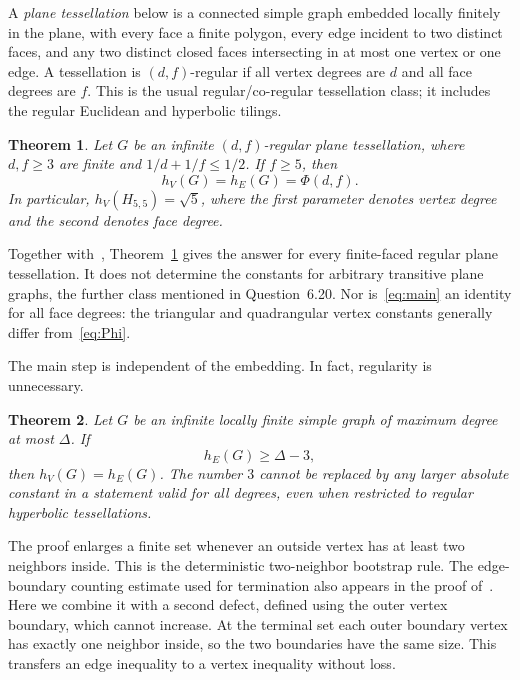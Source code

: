 \documentclass[11pt]{amsart}
\numberwithin{equation}{section}
\newtheorem{theorem}{Theorem}[section]
\theoremstyle{definition}
\theoremstyle{remark}
\newcommand{\hE}{h_E}
\newcommand{\hV}{h_V}
\begin{document}
A \emph{plane tessellation} below is a connected simple graph embedded locally finitely in the plane, with every face a finite polygon, every edge incident to two distinct faces, and any two distinct closed faces intersecting in at most one vertex or one edge. A tessellation is $(d,f)$-regular if all vertex degrees are $d$ and all face degrees are $f$. This is the usual regular/co-regular tessellation class; it includes the regular Euclidean and hyperbolic tilings.

\begin{theorem}\label{thm:tiling}
Let $G$ be an infinite $(d,f)$-regular plane tessellation, where $d,f\ge3$ are finite and $1/d+1/f\le1/2$. If $f\ge5$, then
\begin{equation}\label{eq:main}
\hV(G)=\hE(G)=\Phi(d,f).
\end{equation}
In particular, $\hV(H_{5,5})=\sqrt5$, where the first parameter denotes vertex degree and the second denotes face degree.
\end{theorem}

Together with~\cite{HP}, Theorem~\ref{thm:tiling} gives the answer for every finite-faced regular plane tessellation. It does not determine the constants for arbitrary transitive plane graphs, the further class mentioned in Question~6.20. Nor is~\eqref{eq:main} an identity for all face degrees: the triangular and quadrangular vertex constants generally differ from~\eqref{eq:Phi}.

The main step is independent of the embedding. In fact, regularity is unnecessary.

\begin{theorem}\label{thm:degree}
Let $G$ be an infinite locally finite simple graph of maximum degree at most $\Delta$. If
\begin{equation}\label{eq:threshold}
\hE(G)\ge\Delta-3,
\end{equation}
then $\hV(G)=\hE(G)$. The number $3$ cannot be replaced by any larger absolute constant in a statement valid for all degrees, even when restricted to regular hyperbolic tessellations.
\end{theorem}

The proof enlarges a finite set whenever an outside vertex has at least two neighbors inside. This is the deterministic two-neighbor bootstrap rule. The edge-boundary counting estimate used for termination also appears in the proof of~\cite[Theorem~1.4]{BPP}. Here we combine it with a second defect, defined using the outer vertex boundary, which cannot increase. At the terminal set each outer boundary vertex has exactly one neighbor inside, so the two boundaries have the same size. This transfers an edge inequality to a vertex inequality without loss.
\end{document}
